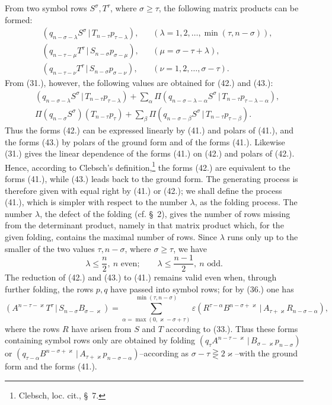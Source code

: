 \documentclass[11pt]{article}
\providecommand{\pair}[2]{(#1\,|\,#2)}
\providecommand{\eps}{\varepsilon}
\begin{document}
From two symbol rows $S^\sigma,T^\tau$, where $\sigma\ge\tau$, the following matrix products can be formed:
\begin{align}
&\pair{q_{n-\sigma-\lambda}S^\sigma}{T_{n-\tau}p_{\tau-\lambda}}, &&(\lambda=1,2,\ldots,\min(\tau,n-\sigma)),\tag{41}\\
&\pair{q_{n-\tau-\mu}T^\tau}{S_{n-\sigma}p_{\sigma-\mu}}, &&(\mu=\sigma-\tau+\lambda),\tag{42}\\
&\pair{q_{n-\tau-\nu}T^\tau}{S_{n-\sigma}p_{\sigma-\nu}}, &&(\nu=1,2,\ldots,\sigma-\tau).
\tag{43}
\end{align}
From (31.), however, the following values are obtained for (42.) and (43.):
\begin{align}
&\pair{q_{n-\sigma-\lambda}S^\sigma}{T_{n-\tau}p_{\tau-\lambda}}
 +\sum_{\alpha}\Pi\pair{q_{n-\sigma-\lambda-\alpha}S^\sigma}{T_{n-\tau}p_{\tau-\lambda-\alpha}},\tag{42a}\\
&\Pi(q_{n-\sigma}S^\sigma)(T_{n-\tau}p_\tau)
 +\sum_{\beta}\Pi\pair{q_{n-\sigma-\beta}S^\sigma}{T_{n-\tau}p_{\tau-\beta}}.
\tag{43a}
\end{align}
Thus the forms (42.) can be expressed linearly by (41.) and polars of (41.), and the forms (43.) by polars of the ground form and of the forms (41.). Likewise (31.) gives the linear dependence of the forms (41.) on (42.) and polars of (42.). Hence, according to Clebsch's definition,\footnote{Clebsch, loc. cit., \S\ 7.} the forms (42.) are equivalent to the forms (41.), while (43.) leads back to the ground form. The generating process is therefore given with equal right by (41.) or (42.); we shall define the process (41.), which is simpler with respect to the number $\lambda$, as the folding process. The number $\lambda$, the defect of the folding (cf. \S\ 2), gives the number of rows missing from the determinant product, namely in that matrix product which, for the given folding, contains the maximal number of rows. Since $\lambda$ runs only up to the smaller of the two values $\tau,n-\sigma$, where $\sigma\ge\tau$, we have
\begin{equation}
 \lambda\le\frac n2,\ n\text{ even};\qquad
 \lambda\le\frac{n-1}{2},\ n\text{ odd}.
\tag{44}
\end{equation}
The reduction of (42.) and (43.) to (41.) remains valid even when, through further folding, the rows $p,q$ have passed into symbol rows; for by (36.) one has
\[
 \pair{A^{n-\tau-\varkappa}T^\tau}{S_{n-\sigma}B_{\sigma-\varkappa}}
 =\sum_{\alpha=\max(0,\varkappa-\sigma+\tau)}^{\min(\tau,n-\sigma)}
 \eps\pair{R^{\tau-\alpha}B^{n-\sigma+\varkappa}}{A_{\tau+\varkappa}R_{n-\sigma-\alpha}},
\]
where the rows $R$ have arisen from $S$ and $T$ according to (33.). Thus these forms containing symbol rows only are obtained by folding $\pair{q_\tau A^{n-\tau-\varkappa}}{B_{\sigma-\varkappa}p_{n-\sigma}}$ or $\pair{q_{\tau-\alpha}B^{n-\sigma+\varkappa}}{A_{\tau+\varkappa}p_{n-\sigma-\alpha}}$--according as $\sigma-\tau\gtreqless 2\varkappa$--with the ground form and the forms (41.).
\end{document}
